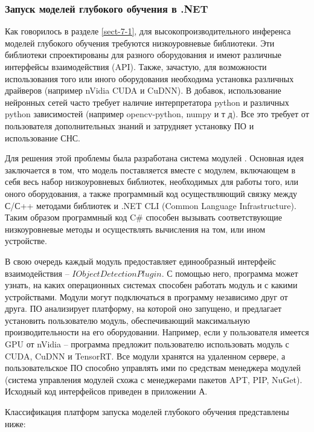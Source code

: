 \subsubsection{Запуск моделей глубокого обучения в .NET}

Как говорилось в разделе \ref{sect-7-1}, для высокопроизводительного инференса моделей глубокого обучения требуются низкоуровневые библиотеки. Эти библиотеки спроектированы для разного оборудования и имеют различные интерфейсы взаимодействия (API). Также, зачастую, для возможности использования того или иного оборудования необходима установка различных драйверов (например nVidia CUDA и CuDNN). В добавок, использование нейронных сетей часто требует наличие интерпретатора python и различных python зависимостей (например opencv-python, numpy и т д). Все это требует от пользователя дополнительных знаний и затрудняет установку ПО и использование СНС.

Для решения этой проблемы была разработана система модулей \cite{lib-plugins}. Основная идея заключается в том, что модель поставляется вместе с модулем, включающем в себя весь набор низкоуровневых библиотек, необходимых для работы того, или оного оборудования, а также программный код осуществляющий связку между С\slash С++ методами библиотек и .NET CLI (Common Language Infrastructure). Таким образом программный код C\# способен вызывать соответствующие низкоуровневые методы и осуществлять вычисления на том, или ином устройстве.

В свою очередь каждый модуль предоставляет единообразный интерфейс взаимодействия -- $IObjectDetectionPlugin$. С помощью него, программа может узнать, на каких операционных системах способен работать модуль и с какими устройствами. Модули могут подключаться в программу независимо друг от друга. ПО анализирует платформу, на которой оно запущено, и предлагает установить пользователю модуль, обеспечивающий максимальную производительности на его оборудовании. Например, если у пользователя имеется GPU от nVidia -- программа предложит пользователю использовать модуль с CUDA, CuDNN и TensorRT. Все модули хранятся на удаленном сервере, а пользовательское ПО способно управлять ими по средствам менеджера модулей (система управления модулей схожа с менеджерами пакетов APT, PIP, NuGet). Исходный код интерфейсов приведен в приложении А.

Классификация платформ запуска моделей глубокого обучения представлены ниже:

